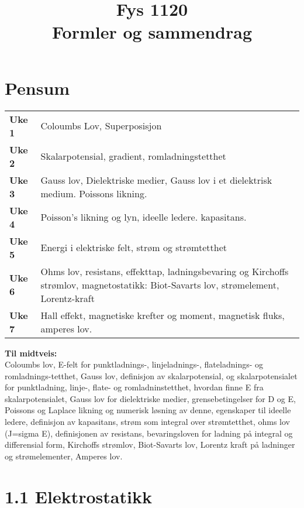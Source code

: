 \documentclass[
12pt, reprint, aip, onecolumn, notitlepage
]{revtex4-1}
\begin{document}
	\title{Fys 1120\\ \normalsize Formler og sammendrag} 
	\maketitle 


\section{Pensum} 

\begin{table}[!h]
	\begin{tabular}{ l l }
		\textbf{Uke 1} & Coloumbs Lov, Superposisjon\\ 
	   \textbf{Uke 2} & Skalarpotensial, gradient, romladningstetthet \\
	   \textbf{Uke 3} & Gauss lov, Dielektriske medier, Gauss lov i et dielektrisk medium. Poissons likning. \\
	   \textbf{Uke 4} & Poisson's likning og lyn, ideelle ledere. kapasitans.\\
	   \textbf{Uke 5} & Energi i elektriske felt, strøm og strømtetthet\\
	   \textbf{Uke 6} & Ohms lov, resistans, effekttap, ladningsbevaring og Kirchoffs strømlov, magnetostatikk: Biot-Savarts lov, strømelement, Lorentz-kraft \\
	   \textbf{Uke 7} &  Hall effekt, magnetiske krefter og moment, magnetisk fluks, amperes lov.
 	\end{tabular}
\end{table}

\textbf{Til midtveis:} \\
Coloumbs lov, E-felt for punktladnings-, linjeladnings-, flateladnings- og romladnings-tetthet, Gauss lov, definisjon av skalarpotensial, og skalarpotensialet for punktladning, linje-, flate- og romladninstetthet, hvordan finne E fra skalarpotensialet, Gauss lov for dielektriske medier, grensebetingelser for D og E, Poissons og Laplace likning og numerisk løsning av denne, egenskaper til ideelle ledere, definisjon av kapasitans, strøm som integral over strømtetthet, ohms lov (J=sigma E), definisjonen av resistans, bevaringsloven for ladning på integral og differensial form, Kirchoffs strømlov, Biot-Savarts lov, Lorentz kraft på ladninger og strømelementer, Amperes lov.
\newpage 


\section{1.1 Elektrostatikk}
\end{document}
